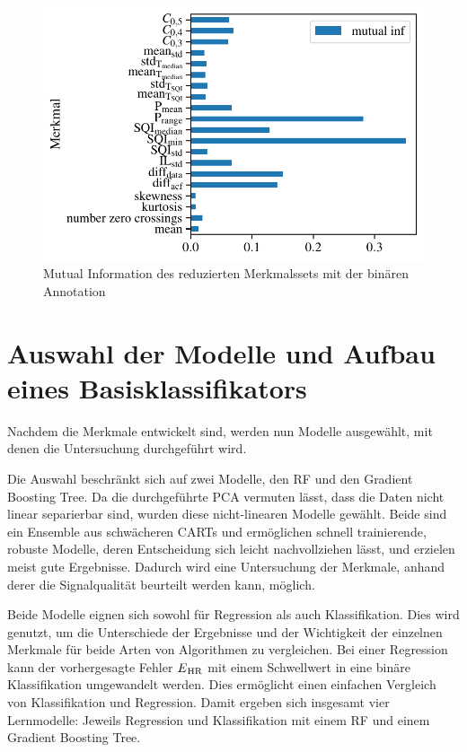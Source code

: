 \begin{figure}[H] %
	\centering
	\includegraphics{pic/mutual-inf-own-reduced.pdf}
	\caption{Mutual Information des reduzierten Merkmalssets mit der binären Annotation}
	\label{fig:mutual-inf-own-all}
\end{figure}

\section{Auswahl der Modelle und Aufbau eines Basisklassifikators}

Nachdem die Merkmale entwickelt sind, werden nun Modelle ausgewählt, mit denen die Untersuchung durchgeführt wird.

Die Auswahl beschränkt sich auf zwei Modelle, den \acl{RF} und den Gradient Boosting Tree. Da die durchgeführte \ac{PCA} vermuten lässt, dass die Daten nicht linear separierbar sind, wurden diese nicht-linearen Modelle gewählt. Beide sind ein Ensemble aus schwächeren \ac{CART}s und ermöglichen schnell trainierende, robuste Modelle, deren Entscheidung sich leicht nachvollziehen lässt, und erzielen meist gute Ergebnisse. Dadurch wird eine Untersuchung der Merkmale, anhand derer die Signalqualität beurteilt werden kann, möglich.

Beide Modelle eignen sich sowohl für Regression als auch Klassifikation. Dies wird genutzt, um die Unterschiede der Ergebnisse und der Wichtigkeit der einzelnen Merkmale für beide Arten von Algorithmen zu vergleichen. Bei einer Regression kann der vorhergesagte Fehler $E\textsubscript{HR}$ mit einem Schwellwert in eine binäre Klassifikation umgewandelt werden. Dies ermöglicht einen einfachen Vergleich von Klassifikation und Regression. Damit ergeben sich insgesamt vier Lernmodelle: Jeweils Regression und Klassifikation mit einem \ac{RF} und einem Gradient Boosting Tree.


